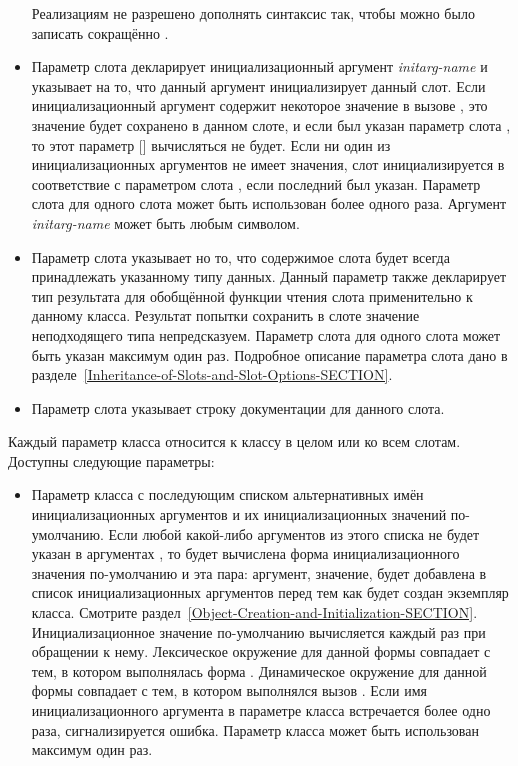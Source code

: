 \begin{defmac}
\begin{itemize}
Реализациям не разрешено дополнять синтаксис  так, чтобы
 можно было записать сокращённо
.

\item 
Параметр слота  декларирует инициализационный аргумент
\emph{initarg-name} и указывает на то, что данный аргумент инициализирует данный
слот. Если инициализационный аргумент содержит некоторое значение в вызове
, это значение будет сохранено в данном слоте, и если
был указан параметр слота , то этот параметр []
вычисляться не 
будет. Если ни один из инициализационных аргументов не имеет значения, слот
инициализируется в соответствие с параметром слота , если
последний был указан. Параметр слота  для одного слота может быть
использован более одного раза. Аргумент \emph{initarg-name} может быть любым
символом.

\item 
Параметр слота  указывает но то, что содержимое слота будет всегда
принадлежать указанному типу данных. Данный параметр также декларирует тип
результата для обобщённой функции чтения слота применительно к данному
класса. Результат попытки сохранить в слоте значение неподходящего типа
непредсказуем. Параметр слота  для одного слота может быть указан
максимум один раз. Подробное описание параметра слота  дано в
разделе~\ref{Inheritance-of-Slots-and-Slot-Options-SECTION}.

\item 
Параметр слота  указывает строку документации для данного
слота.
\end{itemize}

Каждый параметр класса относится к классу в целом или ко всем слотам. Доступны
следующие параметры:

\begin{itemize}

\item 
Параметр класса  с последующим списком альтернативных имён
инициализационных аргументов и их инициализационных значений по-умолчанию.
Если любой какой-либо аргументов из этого списка не будет указан в
аргументах , то будет вычислена форма инициализационного
значения по-умолчанию и эта пара: аргумент, значение, будет добавлена в список
инициализационных аргументов перед тем как будет создан экземпляр
класса. Смотрите
раздел~\ref{Object-Creation-and-Initialization-SECTION}. Инициализационное
значение по-умолчанию вычисляется каждый раз при обращении к нему. Лексическое
окружение для данной формы совпадает с тем, в котором выполнялась форма
. Динамическое окружение для данной формы совпадает с тем, в
котором выполнялся вызов . Если имя инициализационного
аргумента в параметре класса  встречается более одно раза,
сигнализируется ошибка. Параметр класса  может быть
использован максимум один раз.


\end{itemize}
\end{defmac}
